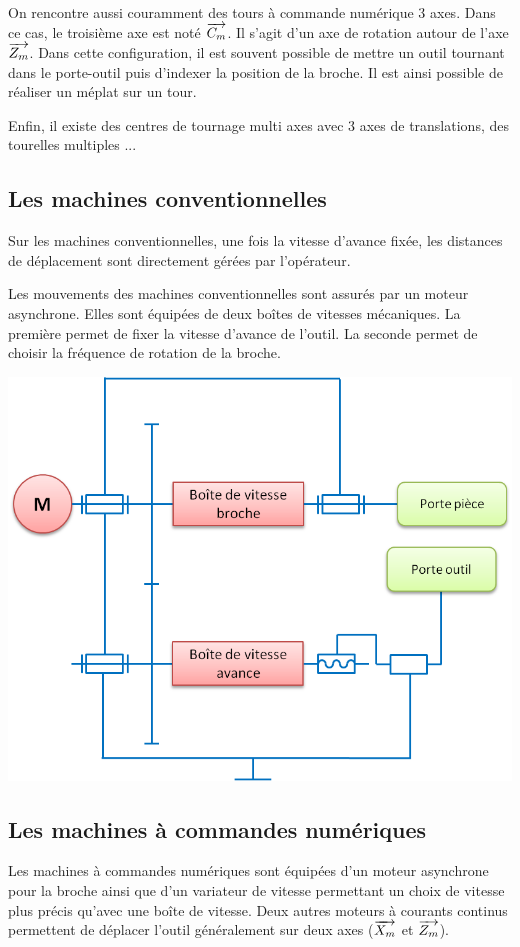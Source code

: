 \documentclass[11pt,oneside]{article}
\begin{document}
On rencontre aussi couramment des tours à commande numérique 3 axes. Dans ce cas, le troisième axe est noté $\overrightarrow{C_m}$. Il s'agit d'un axe de rotation autour de l'axe $\overrightarrow{Z_m}$. Dans cette configuration, il est souvent possible de mettre un outil tournant dans le porte-outil puis d'indexer la position de la broche. Il est ainsi possible de réaliser un méplat sur un tour. 

Enfin, il existe des centres de tournage multi axes avec 3 axes de translations, des tourelles multiples ...

\subsection{Les machines conventionnelles}
Sur les machines conventionnelles, une fois la vitesse d'avance fixée, les distances de déplacement sont directement gérées par l'opérateur. 

Les mouvements des machines conventionnelles sont assurés par un moteur asynchrone. Elles sont équipées de deux  boîtes de vitesses mécaniques. La première permet de fixer la vitesse d'avance de l'outil. La seconde permet de choisir la fréquence de rotation de la broche. 

\begin{center}
\includegraphics[width=.7\textwidth]{png/schema_tour_conv}
\end{center}


\subsection{Les machines à commandes numériques}
Les machines à commandes numériques sont équipées d'un moteur asynchrone pour la broche ainsi que d'un variateur de vitesse permettant un choix de vitesse plus précis qu'avec une boîte de vitesse. Deux autres moteurs à courants continus permettent de déplacer l'outil généralement sur deux axes ($\overrightarrow{X_m}$ et $\overrightarrow{Z_m}$). 
\end{document}
